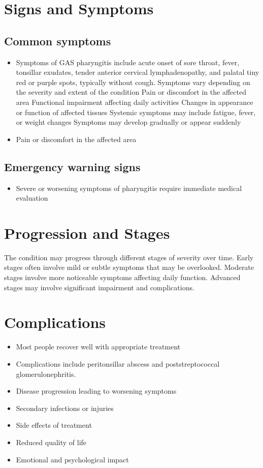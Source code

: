 \section{Signs and Symptoms}

\subsection{Common symptoms}
\begin{itemize}[noitemsep]
  \item Symptoms of GAS pharyngitis include acute onset of sore throat, fever, tonsillar exudates, tender anterior cervical lymphadenopathy, and palatal tiny red or purple spots, typically without cough. Symptoms vary depending on the severity and extent of the condition Pain or discomfort in the affected area Functional impairment affecting daily activities Changes in appearance or function of affected tissues Systemic symptoms may include fatigue, fever, or weight changes Symptoms may develop gradually or appear suddenly
  \item Pain or discomfort in the affected area
  \end{itemize}

\subsection{Emergency warning signs}
\begin{itemize}[noitemsep]
  \item Severe or worsening symptoms of pharyngitis require immediate medical evaluation
\end{itemize}
\section{Progression and Stages}
The condition may progress through different stages of severity over time. Early stages often involve mild or subtle symptoms that may be overlooked. Moderate stages involve more noticeable symptoms affecting daily function. Advanced stages may involve significant impairment and complications.
\section{Complications}
\begin{itemize}[noitemsep]
  \item Most people recover well with appropriate treatment
  \item Complications include peritonsillar abscess and poststreptococcal glomerulonephritis.
  \item Disease progression leading to worsening symptoms
  \item Secondary infections or injuries
  \item Side effects of treatment
  \item Reduced quality of life
  \item Emotional and psychological impact
\end{itemize}
